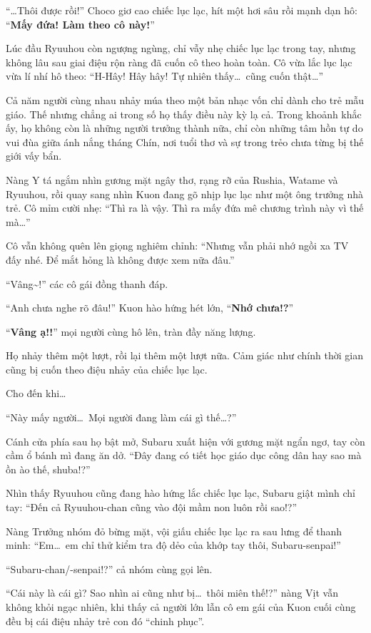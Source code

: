 \documentclass[../main.tex]{subfiles}
\begin{document}
``\dots Thôi được rồi!'' Choco giơ cao chiếc lục lạc, hít một hơi sâu rồi mạnh dạn hô: ``\textbf{Mấy đứa! Làm theo cô này!}''

Lúc đầu Ryuuhou còn ngượng ngùng, chỉ vẫy nhẹ chiếc lục lạc trong tay, nhưng không lâu sau giai điệu rộn ràng đã cuốn cô theo hoàn toàn. Cô vừa lắc lục lạc vừa lí nhí hô theo: ``H-Hây! Hây hây! Tự nhiên thấy\dots\ cũng cuốn thật\dots''

Cả năm người cùng nhau nhảy múa theo một bản nhạc vốn chỉ dành cho trẻ mẫu giáo. Thế nhưng chẳng ai trong số họ thấy điều này kỳ lạ cả. Trong khoảnh khắc ấy, họ không còn là những người trưởng thành nữa, chỉ còn những tâm hồn tự do vui đùa giữa ánh nắng tháng Chín, nơi tuổi thơ và sự trong trẻo chưa từng bị thế giới vấy bẩn.

Nàng Y tá ngắm nhìn gương mặt ngây thơ, rạng rỡ của Rushia, Watame và Ryuuhou, rồi quay sang nhìn Kuon đang gõ nhịp lục lạc như một ông trưởng nhà trẻ. Cô mỉm cười nhẹ: ``Thì ra là vậy. Thì ra mấy đứa mê chương trình này vì thế mà\dots''

Cô vẫn không quên lên giọng nghiêm chỉnh: ``Nhưng vẫn phải nhớ ngồi xa TV đấy nhé. Để mắt hỏng là không được xem nữa đâu.''

``Vâng\~{}!'' các cô gái đồng thanh đáp.

``Anh chưa nghe rõ đâu!'' Kuon hào hứng hét lớn, ``\textbf{Nhớ chưa!?}''

``\textbf{Vâng ạ!!}'' mọi người cùng hô lên, tràn đầy năng lượng.

Họ nhảy thêm một lượt, rồi lại thêm một lượt nữa. Cảm giác như chính thời gian cũng bị cuốn theo điệu nhảy của chiếc lục lạc.

Cho đến khi\dots

``Này mấy người\dots\ Mọi người đang làm cái gì thế\dots?''

Cánh cửa phía sau họ bật mở, Subaru xuất hiện với gương mặt ngẩn ngơ, tay còn cầm ổ bánh mì đang ăn dở. ``Đây đang có tiết học giáo dục công dân hay sao mà ồn ào thế, shuba!?''

Nhìn thấy Ryuuhou cũng đang hào hứng lắc chiếc lục lạc, Subaru giật mình chỉ tay: ``Đến cả Ryuuhou-chan cũng vào đội mầm non luôn rồi sao!?''

Nàng Trưởng nhóm đỏ bừng mặt, vội giấu chiếc lục lạc ra sau lưng để thanh minh: ``Em\dots\ em chỉ thử kiểm tra độ dẻo của khớp tay thôi, Subaru-senpai!''

``Subaru-chan/-senpai!?'' cả nhóm cùng gọi lên.

``Cái này là cái gì? Sao nhìn ai cũng như bị\dots\ thôi miên thế!?'' nàng Vịt vẫn không khỏi ngạc nhiên, khi thấy cả người lớn lẫn cô em gái của Kuon cuối cùng đều bị cái điệu nhảy trẻ con đó ``chinh phục''.
\end{document}
